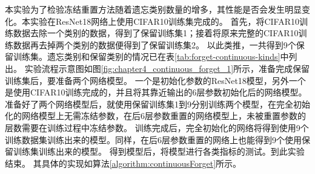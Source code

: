 本实验为了检验冻结重置方法随着遗忘类别数量的增多，其性能是否会发生明显变化。本实验在ResNet18网络上使用CIFAR10训练集完成的。
首先，将CIFAR10训练数据去除一个类别的数据，得到了保留训练集1；接着将原来完整的CIFAR10训练数据再去掉两个类别的数据便得到了保留训练集2。
以此类推，一共得到9个保留训练集。遗忘类别和保留类别的情况已在表\ref{tab:forget-continuous-kinds}中列出。
实验流程示意图如图\ref{fig:chapter4_continuous_forget_1}所示，准备完成保留训练集后，要准备两个网络模型。
一个是初始化参数的ResNet18模型，另外一个是使用CIFAR10训练完成的，并且将其靠近输出的6层参数初始化后的网络模型。
准备好了两个网络模型后，就使用保留训练集1到9分别训练两个模型，在完全初始化的网络模型上无需冻结参数，在后6层参数重置的网络模型上，未被重置参数的层数需要在训练过程中冻结参数。
训练完成后，完全初始化的网络将得到使用9个训练数据集训练出来的模型。同样，在后6层参数重置的网络上也能得到9个使用保留训练集训练出来的模型。
得到模型后，将模型进行各类指标的测试。到此实验结束。
其具体的实现如算法\ref{algorithm:continuousForget}所示。
